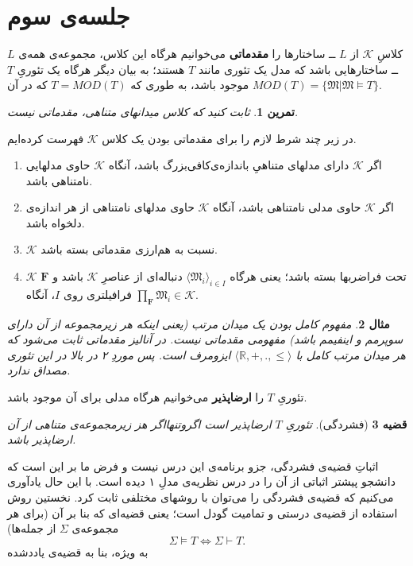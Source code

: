\documentclass[12pt,a4paper]{report}
\theoremstyle{colorhead}
\newtheorem{thm}{قضیه}
\newtheorem{tam}[thm]{تمرین}
\newtheorem{mesal}[thm]{مثال}
\begin{document}
\section{جلسه‌ی سوم}
کلاسِ
$\mathcal{K}$
از
$L$ ــ
ساختارها را 
\textbf{مقدماتی}
 می‌خوانیم هرگاه این کلاس، مجموعه‌ی همه‌ی
$L$ ــ
ساختارهایی باشد که  مدل یک تئوری مانند
$T$
هستند؛ به بیان دیگر هرگاه یک تئوریِ 
$T$
موجود باشد، به طوری که
$T=MOD(T)$
که 
در آن
$MOD(T)=\{\mathfrak{M}|\mathfrak{M}\models T\}$.
\begin{tam}
ثابت کنید که کلاس میدانهای متناهی، مقدماتی نیست.
\end{tam}
در زیر چند شرط لازم را برای مقدماتی بودن یک کلاس
$\mathcal{K}$
فهرست کرده‌ایم.
\begin{enumerate}
\item 
اگر
$\mathcal{K}$
دارای 
مدلهای متناهیِ‌ باندازه‌ی‌کافی‌بزرگ باشد، آنگاه
$\mathcal{K}$
حاوی مدلهایی نامتناهی باشد.
\item 
اگر
$\mathcal{K}$
حاوی 
مدلی نامتناهی باشد، آنگاه
$\mathcal{K}$
حاوی مدلهای نامتناهی از هر اندازه‌ی دلخواه باشد.
\item
$\mathcal{K}$
نسبت به هم‌ارزی مقدماتی بسته باشد.
\item 
$\mathcal{K}$
تحت فراضربها بسته باشد؛ یعنی هرگاه
$\langle \mathfrak{M}_i\rangle_{i\in I}$
دنباله‌ای از عناصرِ
$\mathcal{K}$
باشد و 
$\mathbf{F}$
فرافیلتری
روی
$I$،
آنگاه
$\prod_\mathbf{F}\mathfrak{M}_i\in \mathcal{K}$.
\end{enumerate}
\begin{mesal}
مفهوم کامل بودن یک میدان مرتب (یعنی اینکه هر زیرمجموعه‌ از آن دارای سوپرمم و اینفیمم باشد)‌ مفهومی مقدماتی نیست. در آنالیز مقدماتی ثابت می‌شود
که هر میدان مرتب کامل با
$\langle \mathbb{R},+,.,\leq\rangle$
ایزومرف است. پس موردِ ۲ در بالا 
در این تئوری مصداق ندارد.
\end{mesal}
تئوریِ
$T$
 را 
\textbf{ ارضاپذیر }
 می‌خوانیم هرگاه مدلی برای آن موجود باشد.
\begin{thm}[فشردگی]
تئوریِ
$T$
ارضاپذیر است اگروتنهااگر
هز زیرمجموعه‌ی متناهی از آن ارضاپذیر باشد. 
\end{thm}
اثباتِ قضیه‌ی فشردگی، جزو برنامه‌ی این درس نیست و فرض ما بر این است که دانشجو پیشتر اثباتی از آن را در درس نظریه‌ی مدلِ ۱ دیده است. با این حال یادآوری می‌کنیم
که قضیه‌ی فشردگی را می‌توان با روشهای مختلفی ثابت کرد. نخستین روش استفاده از قضیه‌ی درستی و تمامیت گودل است؛ یعنی قضیه‌ای که بنا بر آن (برای هر مجموعه‌ی
$\Sigma$
از جمله‌ها)
\[
\Sigma \models T \Leftrightarrow \Sigma\vdash T.
\]
به ویژه، بنا به قضیه‌ی یاددشده
\end{document}
